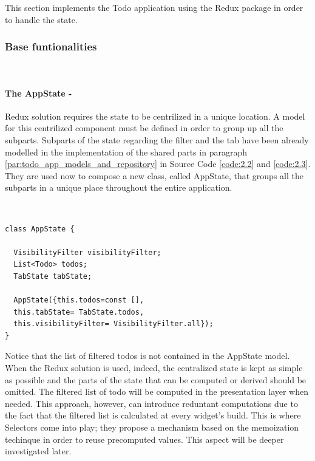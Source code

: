 This section implements the Todo application using the Redux package in order to handle the state. 
\subsubsection{Base funtionalities}  \label{par:todo_app_inherited_widget_introduction}
\hfill\\
\paragraph{The AppState - }
\label{subpar:todo_app_bloc_core_state}

Redux solution requires the state to be centrilized in a unique location. A model for this centrilized component must be defined in order to group up all the subparts. Subparts of the state regarding the filter and the tab have been already modelled in the implementation of the shared parts in paragraph  \ref{par:todo_app_models_and_repository} in Source Code \ref{code:2.2} and \ref{code:2.3}. They are used now to compose a new class, called AppState, that groups all the subparts in a unique place throughout the entire application. 
\begin{code}
\mbox{}\\
 \mbox{}
		\label{code:2.14}
\begin{verbatim}
class AppState {

  VisibilityFilter visibilityFilter;
  List<Todo> todos;
  TabState tabState;

  AppState({this.todos=const [],
  this.tabState= TabState.todos,
  this.visibilityFilter= VisibilityFilter.all});
}
\end{verbatim}
\mbox{}
\end{code}

Notice that the list of filtered todos is not contained in the AppState model. When the Redux solution is used, indeed, the centralized state is kept as simple as possible and the parts of the state that can be computed or derived should be omitted. The filtered list of todo will be computed in the presentation layer when needed. This approach, however, can introduce reduntant computations due to the fact that the filtered list is calculated at every widget's build. This is where Selectors come into play; they propose a mechanism based on the memoization techinque in order to reuse precomputed values. This aspect will be deeper investigated later.
